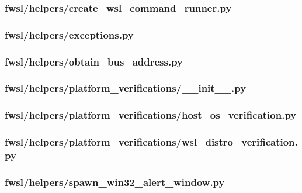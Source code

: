 \subsubsection{fwsl/helpers/create\_wsl\_command\_runner.py}


\subsubsection{fwsl/helpers/exceptions.py}


\subsubsection{fwsl/helpers/obtain\_bus\_address.py}


\subsubsection{fwsl/helpers/platform\_verifications/\_\_init\_\_.py}


\subsubsection{fwsl/helpers/platform\_verifications/host\_os\_verification.py}


\subsubsection{fwsl/helpers/platform\_verifications/wsl\_distro\_verification.py}


\subsubsection{fwsl/helpers/spawn\_win32\_alert\_window.py}



